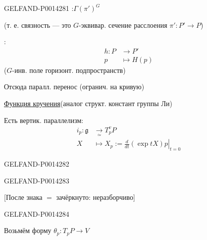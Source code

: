 \begin{GelfandAdjacentEvidence}{GELFAND-P001428}{1}
:\quad \(\Gamma(\pi')^G\)

(т. е. связность — это \(G\)-эквивар. сечение расслоения \(\pi'\colon P'\to P\))

:
\[
\begin{aligned}
h\colon P&\to P'\\
p&\mapsto H(p)
\end{aligned}
\]
(\(G\)-инв. поле горизонт. подпространств)

Отсюда паралл. перенос (огранич. на кривую)

\uline{Функция кручения}\qquad (аналог структ. констант группы Ли)

Есть вертик. параллелизм:
\[
\begin{aligned}
i_p\colon\mathfrak g&\underset{\simeq}{\longrightarrow}T_p^vP\\
X&\mapsto X_p:=\left.\frac{d}{dt}(\exp tX)p\right|_{t=0}
\end{aligned}
\]
\end{GelfandAdjacentEvidence}
\begin{GelfandAdjacentEvidence}{GELFAND-P001428}{2}


\end{GelfandAdjacentEvidence}
\begin{GelfandAdjacentEvidence}{GELFAND-P001428}{3}

[После знака \(=\) зачёркнуто: неразборчиво]
\end{GelfandAdjacentEvidence}
\begin{GelfandAdjacentEvidence}{GELFAND-P001428}{4}


Возьмём форму \(\theta_p\colon T_pP\to V\)
\end{GelfandAdjacentEvidence}
